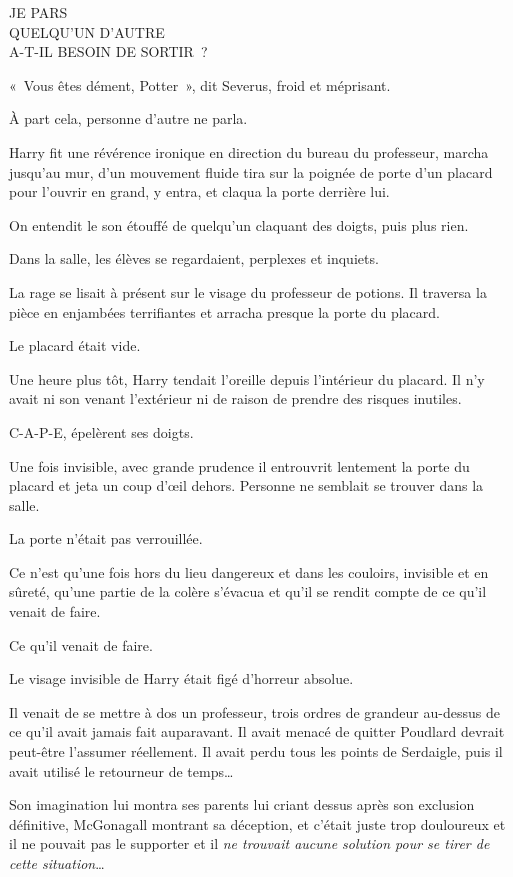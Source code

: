 \medskip
\begin{writtenNote}%
JE PARS\\
QUELQU'UN D'AUTRE\\
A-T-IL BESOIN DE SORTIR~?
\end{writtenNote}%

«~Vous êtes dément, Potter~», dit Severus, froid et méprisant.

À part cela, personne d'autre ne parla.

Harry fit une révérence ironique en direction du bureau du professeur, marcha jusqu'au mur, d'un mouvement fluide tira sur la poignée de porte d'un placard pour l'ouvrir en grand, y entra, et claqua la porte derrière lui.

On entendit le son étouffé de quelqu'un claquant des doigts, puis plus rien.

Dans la salle, les élèves se regardaient, perplexes et inquiets.

La rage se lisait à présent sur le visage du professeur de potions.
Il traversa la pièce en enjambées terrifiantes et arracha presque la porte du placard.

Le placard était vide.

\later

Une heure plus tôt, Harry tendait l'oreille depuis l'intérieur du placard.
Il n'y avait ni son venant l'extérieur ni de raison de prendre des risques inutiles.

C-A-P-E, épelèrent ses doigts.

Une fois invisible, avec grande prudence il entrouvrit lentement la porte du placard et jeta un coup d'œil dehors.
Personne ne semblait se trouver dans la salle.

La porte n'était pas verrouillée.

Ce n'est qu'une fois hors du lieu dangereux et dans les couloirs, invisible et en sûreté, qu'une partie de la colère s'évacua et qu'il se rendit compte de ce qu'il venait de faire.

Ce qu'il venait de faire.

Le visage invisible de Harry était figé d'horreur absolue.

Il venait de se mettre à dos un professeur, trois ordres de grandeur au-dessus de ce qu'il avait jamais fait auparavant.
Il avait menacé de quitter Poudlard devrait peut-être l'assumer réellement.
Il avait perdu tous les points de Serdaigle, puis il avait utilisé le retourneur de temps…

Son imagination lui montra ses parents lui criant dessus après son exclusion définitive, McGonagall montrant sa déception, et c'était juste trop douloureux et il ne pouvait pas le supporter et il \emph{ne trouvait aucune solution pour se tirer de cette situation}…

